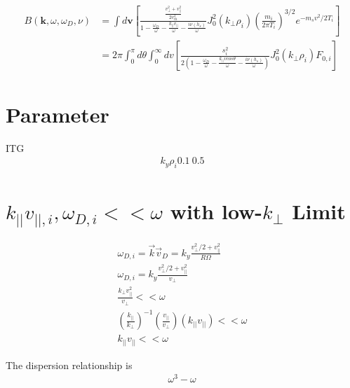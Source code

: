\begin{equation}
    \begin{aligned}
    B(\textbf{k},\omega, \omega_D,\nu){}&=
\int d\textbf{v} \left[
\frac{\frac{v_{\perp}^{2}+v_{ \|}^{2}}{2 v_{t h}^{2}}  
    }{1 -\frac{\omega_D }{\omega}
    - \frac{k_{||}v_{||}}{\omega}-\frac{i\nu(h_s)}{\omega}}J_0^2(k_\perp\rho_i)\left(\frac{m_i}{2\pi T_i}\right)^{3/2}e^{-m_sv^2/2T_i}
 \right]\\
 &=
2\pi \int^\pi_0 d\theta \int ^\infty _0 dv \left[
\frac{s_i^{2}  
    }{2\left(1 -\frac{\omega_D }{\omega}
    - \frac{k_{||}vcos\theta}{\omega}-\frac{i\nu(h_s)}{\omega}\right)}J_0^2(k_\perp\rho_i)F_{0,i}
 \right]
    \end{aligned}
\end{equation}


\section{Parameter}
ITG
\begin{eqnarray}
    k_y\rho_i 0.1~0.5
\end{eqnarray}

\section{$k_{||}v_{||,i}, \omega_{D,i} << \omega$ with low-$k_{\perp}$ Limit}
\begin{eqnarray}
    \omega_{D,i}=\vec{k}\vec{v}_D=k_{y}\frac{v_{\perp}^2/2+v_{\parallel}^2}{R\Omega}\\
    \omega_{D,i}=k_y \frac{v_{\perp}^2/2+v_{\parallel}^2}{v_{\perp}}\\
    \frac{k_{\perp} v_{||}^2}{v_{\perp}}<<\omega\\
        (\frac{k_{||}}{k_\perp})^{-1} (\frac{v_{||}}{v_{\perp}})(k_{||} v_{||})<<\omega\\
    k_{||}v_{||}<<\omega
\end{eqnarray}

The dispersion relationship is 
\begin{eqnarray}
    \omega^3-\omega_{}
\end{eqnarray}